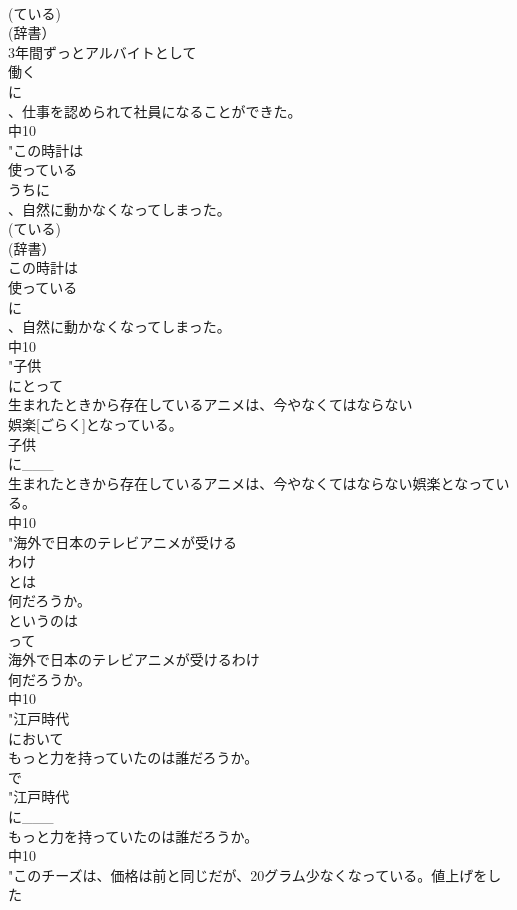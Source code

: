 \documentclass[8pt]{extreport}
\begin{document}
\begin{CJK}{UTF8}{min}
\\	(ている) 
\\	(辞書） 
\\	3年間ずっとアルバイトとして
\\	働く
\\	に
\\	、仕事を認められて社員になることができた。
\\	中10
\\	"この時計は
\\	使っている
\\	うちに
\\	、自然に動かなくなってしまった。
\\	(ている) 
\\	(辞書） 
\\	この時計は
\\	使っている
\\	に
\\	、自然に動かなくなってしまった。
\\	中10
\\	"子供
\\	にとって
\\	生まれたときから存在しているアニメは、今やなくてはならない
\\	娯楽[ごらく]となっている。
\\	子供
\\	に___
\\	生まれたときから存在しているアニメは、今やなくてはならない娯楽となっている。
\\	中10
\\	"海外で日本のテレビアニメが受ける
\\	わけ
\\	とは
\\	何だろうか。
\\	というのは
\\	って
\\	海外で日本のテレビアニメが受けるわけ
\\	何だろうか。
\\	中10
\\	"江戸時代
\\	において
\\	もっと力を持っていたのは誰だろうか。
\\	で 
\\	"江戸時代
\\	に___
\\	もっと力を持っていたのは誰だろうか。
\\	中10
\\	"このチーズは、価格は前と同じだが、20グラム少なくなっている。値上げをした

\end{CJK}
\end{document}
